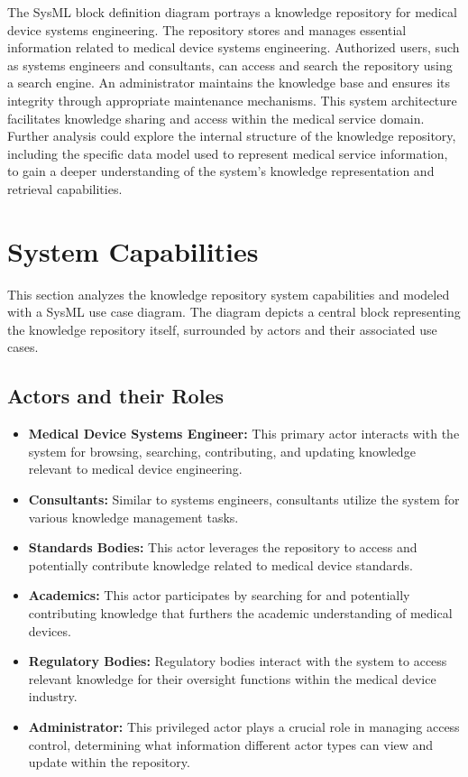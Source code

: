\documentclass[
  letterpaper,
  DIV=11,
  numbers=noendperiod]{scrreprt}
\begin{document}
The SysML block definition diagram portrays a knowledge repository for
medical device systems engineering. The repository stores and manages
essential information related to medical device systems engineering.
Authorized users, such as systems engineers and consultants, can access
and search the repository using a search engine. An administrator
maintains the knowledge base and ensures its integrity through
appropriate maintenance mechanisms. This system architecture facilitates
knowledge sharing and access within the medical service domain. Further
analysis could explore the internal structure of the knowledge
repository, including the specific data model used to represent medical
service information, to gain a deeper understanding of the system's
knowledge representation and retrieval capabilities.

\section{System Capabilities}\label{system-capabilities}

This section analyzes the knowledge repository system capabilities and
modeled with a SysML use case diagram. The diagram depicts a central
block representing the knowledge repository itself, surrounded by actors
and their associated use cases.

\subsection{Actors and their Roles}\label{actors-and-their-roles}

\begin{itemize}
\item
  \textbf{Medical Device Systems Engineer:} This primary actor interacts
  with the system for browsing, searching, contributing, and updating
  knowledge relevant to medical device engineering.
\item
  \textbf{Consultants:} Similar to systems engineers, consultants
  utilize the system for various knowledge management tasks.
\item
  \textbf{Standards Bodies:} This actor leverages the repository to
  access and potentially contribute knowledge related to medical device
  standards.
\item
  \textbf{Academics:} This actor participates by searching for and
  potentially contributing knowledge that furthers the academic
  understanding of medical devices.
\item
  \textbf{Regulatory Bodies:} Regulatory bodies interact with the system
  to access relevant knowledge for their oversight functions within the
  medical device industry.
\item
  \textbf{Administrator:} This privileged actor plays a crucial role in
  managing access control, determining what information different actor
  types can view and update within the repository.
\end{itemize}
\end{document}
